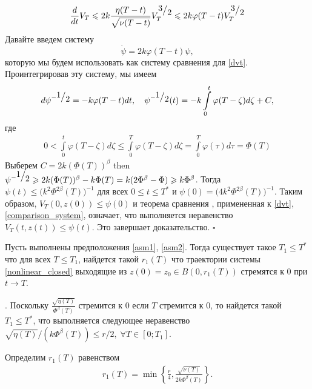 \documentclass[../main.tex]{subfiles}
\begin{document}
\begin{equation}\label{dvt}
    \frac{d}{dt}V_T \leqslant 2 k \frac{\eta(T-t)}{\sqrt{\nu(T-t)}}V_T^{\frc{3}{2}} \leqslant 2k \varphi(T-t) V_T^{\frc{3}{2}}
\end{equation}
Давайте введем систему
\begin{equation}\label{comparison_system}
    \dot{\psi} = 2k \varphi(T-t) \psi,
\end{equation}
которую мы будем использовать как систему сравнения для \eqref{dvt}. 
Проинтегрировав эту систему, мы имеем
\begin{gather*}
    d\psi^{-\frc{1}{2}} = -k \varphi(T-t) dt, \quad
    \psi^{-\frc{1}{2}}(t) = -k \int\limits_0^t \varphi(T-\zeta) d\zeta + C,
\end{gather*}
где
\begin{gather*}
    0 < \int\limits_0^t \varphi(T-\zeta) d\zeta \leqslant \int\limits_0^T \varphi(T-\zeta) d\zeta = 
    \int\limits_0^T \varphi(\tau) d\tau = \Phi(T) 
\end{gather*}
Выберем $C = 2k (\Phi(T))^{\beta}$ then $\psi^{-\frc{1}{2}} \geqslant 2k (\Phi(T))^{\beta} - k \Phi(T) = k (2\Phi^\beta - \Phi)\geqslant k\Phi^\beta $.
Тогда $\psi(t) \leqslant \big(k^2\Phi^{2\beta}(T)\big)^{-1}$ для всех $ 0 \leqslant t \leqslant T^* $ и $\psi(0) = \big(4k^2\Phi^{2\beta}(T)\big)^{-1} $.
Таким образом, $V_T(0,z(0))\leqslant \psi(0)$ и теорема сравнения \cite{walter}, примененная к \eqref{dvt}, \eqref{comparison_system}, означает, что выполняется неравенство $V_T(t,z(t))\leqslant \psi(t)$. 
Это завершает доказательство.
	\hfill $ \square $

\begin{theorem}\label{th:tends_to_zero}
    Пусть выполнены предположения \ref{asm1}, \ref{asm2}. Тогда существует такое $ T_1 \leqslant T^*$ что для всех $ T \leqslant T_1$, найдется такой $ r_1(T)$ что траектории системы \eqref{nonlinear_closed} выходящие из $z(0) = z_0 \in B(0,r_1(T))$ стремятся к $0$ при $t \to T$.
\end{theorem}

\doc. 
Поскольку $\frac{\sqrt{\eta(T)}}{\Phi^\beta(T)} $ стремится к $0$ если $T$ стремится к $0$, то найдется такой $ T_1 \leqslant T^*$, что выполняется следующее неравенство
$ \sqrt{\eta(T)}/(k\Phi^\beta(T))  \leqslant r/{2}, \; \forall T \in [0;T_1]$.

Определим $r_1(T)$ равенством
\begin{gather}\label{r1}
    r_1(T) = \min \left\{ \frac{r}{4}, \frac{\sqrt{\nu(T)}}{2k\Phi^\beta(T)} \right\}.
\end{gather}
\end{document}
